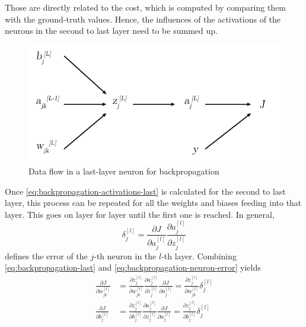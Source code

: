 Those are directly related to the cost, which is computed by comparing them with the ground-truth values.
Hence, the influences of the activations of the neurons in the second to last layer need to be summed up.
\begin{figure}
	\centering
	\includegraphics[]{images/backpropagation_influences.pdf}
	\caption[Data flow in a last-layer neuron for backpropagation]{Data flow in a last-layer neuron for backpropagation}
	\label{fig:backpropagation-influences}
\end{figure}
Once \eqref{eq:backpropagation-activations-last} is calculated for the second to last layer, this process can be repeated for all the weights and biases feeding into that layer.
This goes on layer for layer until the first one is reached.
In general,
\begin{equation}
	\label{eq:backpropagation-neuron-error}
	\delta^{[l]}_j = \frac{\partial J}{\partial a^{[l]}_j} \frac{\partial a^{[l]}_{j}}{\partial z^{[l]}_{j}}
\end{equation}
defines the error of the $j$-th neuron in the $l$-th layer.
Combining \eqref{eq:backpropagation-last} and \eqref{eq:backpropagation-neuron-error} yields
\begin{subequations}
	\label{eq:backpropagation-general}
	\begin{align}
		\frac{\partial J}{\partial w^{[l]}_{jk}} &= \frac{\partial z^{[l]}_j}{\partial w^{[l]}_{jk}} \frac{\partial a^{[l]}_{j}} {\partial z^{[l]}_{j}} \frac{\partial J}{\partial a^{[l]}_j} = \frac{\partial z^{[l]}_j}{\partial w^{[l]}_{jk}} \delta^{[l]}_j \\
		\frac{\partial J}{\partial b^{[l]}_{j}} &= \frac{\partial z^{[l]}_j}{\partial b^{[l]}_{j}} \frac{\partial a^{[l]}_{j}} {\partial z^{[l]}_{j}} \frac{\partial J}{\partial a^{[l]}_j} = \frac{\partial z^{[l]}_j}{\partial b^{[l]}_{j}} \delta^{[l]}_j
	\end{align}
\end{subequations}
